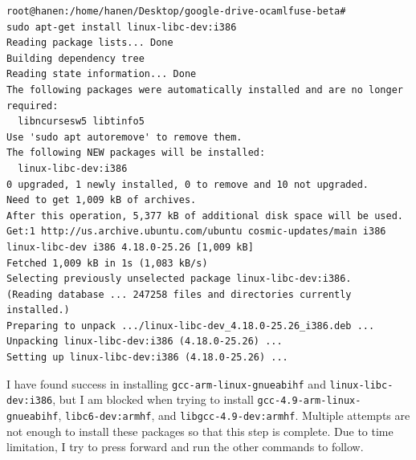 \begin{verbatim}
root@hanen:/home/hanen/Desktop/google-drive-ocamlfuse-beta# 
sudo apt-get install linux-libc-dev:i386 
Reading package lists... Done
Building dependency tree       
Reading state information... Done
The following packages were automatically installed and are no longer required:
  libncursesw5 libtinfo5
Use 'sudo apt autoremove' to remove them.
The following NEW packages will be installed:
  linux-libc-dev:i386
0 upgraded, 1 newly installed, 0 to remove and 10 not upgraded.
Need to get 1,009 kB of archives.
After this operation, 5,377 kB of additional disk space will be used.
Get:1 http://us.archive.ubuntu.com/ubuntu cosmic-updates/main i386 
linux-libc-dev i386 4.18.0-25.26 [1,009 kB]
Fetched 1,009 kB in 1s (1,083 kB/s)           
Selecting previously unselected package linux-libc-dev:i386.
(Reading database ... 247258 files and directories currently installed.)
Preparing to unpack .../linux-libc-dev_4.18.0-25.26_i386.deb ...
Unpacking linux-libc-dev:i386 (4.18.0-25.26) ...
Setting up linux-libc-dev:i386 (4.18.0-25.26) ...
\end{verbatim}
I have found success in installing \verb|gcc-arm-linux-gnueabihf| and \verb|linux-libc-dev:i386|, but I am blocked when trying to install \verb|gcc-4.9-arm-linux-gnueabihf|, \verb|libc6-dev:armhf|, and \verb|libgcc-4.9-dev:armhf|. Multiple attempts are not enough to install these packages so that this step is complete. Due to time limitation, I try to press forward and run the other commands to follow.
